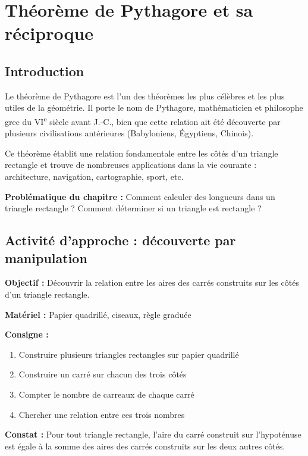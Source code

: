 \chapter{Théorème de Pythagore et sa réciproque}

\section{Introduction}
Le théorème de Pythagore est l'un des théorèmes les plus célèbres et les plus utiles de la géométrie. Il porte le nom de Pythagore, mathématicien et philosophe grec du VI\textsuperscript{e} siècle avant J.-C., bien que cette relation ait été découverte par plusieurs civilisations antérieures (Babyloniens, Égyptiens, Chinois).

Ce théorème établit une relation fondamentale entre les côtés d'un triangle rectangle et trouve de nombreuses applications dans la vie courante : architecture, navigation, cartographie, sport, etc.

\textbf{Problématique du chapitre :} Comment calculer des longueurs dans un triangle rectangle ? Comment déterminer si un triangle est rectangle ?

\section{Activité d'approche : découverte par manipulation}

\textbf{Objectif :} Découvrir la relation entre les aires des carrés construits sur les côtés d'un triangle rectangle.

\textbf{Matériel :} Papier quadrillé, ciseaux, règle graduée

\textbf{Consigne :}
\begin{enumerate}
    \item Construire plusieurs triangles rectangles sur papier quadrillé
    \item Construire un carré sur chacun des trois côtés
    \item Compter le nombre de carreaux de chaque carré
    \item Chercher une relation entre ces trois nombres
\end{enumerate}

\textbf{Constat :} Pour tout triangle rectangle, l'aire du carré construit sur l'hypoténuse est égale à la somme des aires des carrés construits sur les deux autres côtés.

